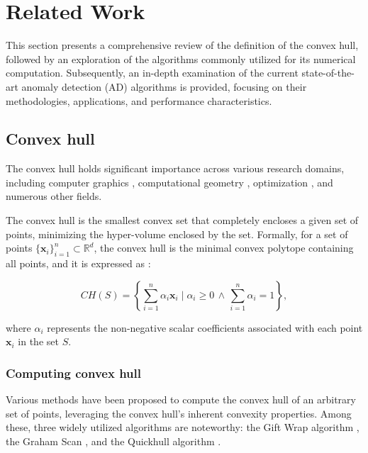 \section{Related Work}
\label{sec:related_work}

This section presents a comprehensive review of the definition of the convex hull, followed by an exploration of the algorithms commonly utilized for its numerical computation. Subsequently, an in-depth examination of the current state-of-the-art anomaly detection (AD) algorithms is provided, focusing on their methodologies, applications, and performance characteristics.

\subsection{Convex hull}
\label{sec:rw_convex_hull}

The convex hull holds significant importance across various research domains, including computer graphics \cite{jayaram2016convex}, computational geometry \cite{lee1984computational}, optimization \cite{lachand2005minimizing}, and numerous other fields.



The convex hull is the smallest convex set that completely encloses a given set of points, minimizing the hyper-volume enclosed by the set. Formally, for a set of points \( \{\boldsymbol{x}_i\}_{i=1}^n \subset \mathbb{R}^d \), the convex hull is the minimal convex polytope containing all points, and it is expressed as \cite{cristescu2013non}:

\begin{equation}
CH(S) = \left\{ \sum_{i=1}^{n} \alpha_i \boldsymbol{x}_i \mid \alpha_i \geq 0 \, \wedge \, \sum_{i=1}^{n} \alpha_i = 1 \right\},
\end{equation}

where \( \alpha_i \) represents the non-negative scalar coefficients associated with each point \( \boldsymbol{x}_i \) in the set \( S \).


\subsubsection{Computing convex hull}
Various methods have been proposed to compute the convex hull of an arbitrary set of points, leveraging the convex hull's inherent convexity properties. Among these, three widely utilized algorithms are noteworthy: the Gift Wrap algorithm \cite{chan1996optimal}, the Graham Scan \cite{xu2010concave}, and the Quickhull algorithm \cite{barber1996quickhull}.


